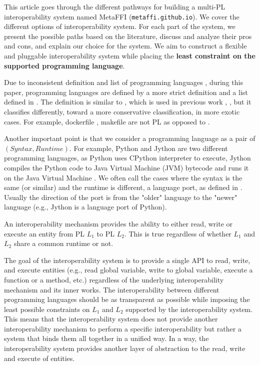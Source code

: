 \documentclass[sigplan,10pt,manuscript,nonacm]{acmart}
\begin{document}
This article goes through the different pathways for building a multi-PL interoperability system named MetaFFI (\texttt{metaffi.github.io}). We cover the different options of interoperability system. For each part of the system, we present the possible paths based on the literature, discuss and analyze their pros and cons, and explain our choice for the system. We aim to construct a flexible and pluggable interoperability system while placing the \textbf{least constraint on the supported programming language}.

Due to inconsistent definition and list of programming languages \cite{github_linguist} \cite{list_of_pl_wiki}, during this paper, programming languages are defined by a more strict definition and a list defined in \cite{empirical_multi_lingual}. The definition is similar to \cite{github_linguist}, which is used in previous work \cite{multilingual_systems_constructed}, \cite{understanding_lang_selection}, but it classifies differently, toward a more conservative classification, in more exotic cases. For example,  dockerfile \cite{dockerfile}, makefile \cite{makefile} are not PL as opposed to \cite{github_linguist}. 

Another important point is that we consider a programming language as a pair of $(Syntax, Runtime)$. For example, Python \cite{cpython} and Jython \cite{jython} are two different programming languages, as Python uses CPython interpreter to execute, Jython compiles the Python code to Java Virtual Machine (JVM) bytecode \cite{jvm_bytecode} and runs it on the Java Virtual Machine \cite{jvm_specs}. We often call the cases where the syntax is the same (or similar) and the runtime is different, a language port, as defined in \cite{empirical_multi_lingual}. Usually the direction of the port is from the "older" language to the "newer" language (e.g., Jython is a language port of Python).

An interoperability mechanism provides the ability to either read, write or execute an entity from PL $L_1$ to PL $L_2$. This is true regardless of whether $L_1$ and $L_2$ share a common runtime or not.

The goal of the interoperability system is to provide a single API to read, write, and execute entities (e.g., read global variable, write to global variable, execute a function or a method, etc.) regardless of the underlying interoperability mechanism and its inner works. The interoperability between different programming languages should be as transparent as possible while imposing the least possible constraints on $L_1$ and $L_2$ supported by the interoperability system. This means that the interoperability system does not provide another interoperability mechanism to perform a specific interoperability but rather a system that binds them all together in a unified way. In a way, the interoperability system provides another layer of abstraction to the read, write and execute of entities.
\end{document}
